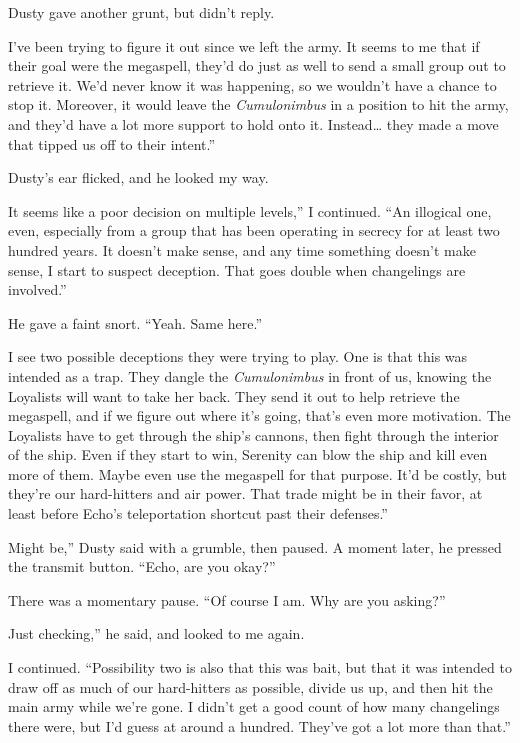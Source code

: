 Dusty gave another grunt, but didn’t reply.

\leavevmode{}I’ve been trying to figure it out since we left the army. It seems to me that if their goal were the megaspell, they’d do just as well to send a small group out to retrieve it. We’d never know it was happening, so we wouldn’t have a chance to stop it. Moreover, it would leave the \textit{Cumulonimbus} in a position to hit the army, and they’d have a lot more support to hold onto it. Instead… they made a move that tipped us off to their intent.”

Dusty’s ear flicked, and he looked my way.

\leavevmode{}It seems like a poor decision on multiple levels,” I continued. “An illogical one, even, especially from a group that has been operating in secrecy for at least two hundred years. It doesn’t make sense, and any time something doesn’t make sense, I start to suspect deception. That goes double when changelings are involved.”

He gave a faint snort. “Yeah. Same here.”

\leavevmode{}I see two possible deceptions they were trying to play. One is that this was intended as a trap. They dangle the \textit{Cumulonimbus} in front of us, knowing the Loyalists will want to take her back. They send it out to help retrieve the megaspell, and if we figure out where it’s going, that’s even more motivation. The Loyalists have to get through the ship’s cannons, then fight through the interior of the ship. Even if they start to win, Serenity can blow the ship and kill even more of them. Maybe even use the megaspell for that purpose. It’d be costly, but they’re our hard-hitters and air power. That trade might be in their favor, at least before Echo’s teleportation shortcut past their defenses.”

\leavevmode{}Might be,” Dusty said with a grumble, then paused. A moment later, he pressed the transmit button. “Echo, are you okay?”

There was a momentary pause. “Of course I am. Why are you asking?”

\leavevmode{}Just checking,” he said, and looked to me again.

I continued. “Possibility two is also that this was bait, but that it was intended to draw off as much of our hard-hitters as possible, divide us up, and then hit the main army while we’re gone. I didn’t get a good count of how many changelings there were, but I’d guess at around a hundred. They’ve got a lot more than that.”

